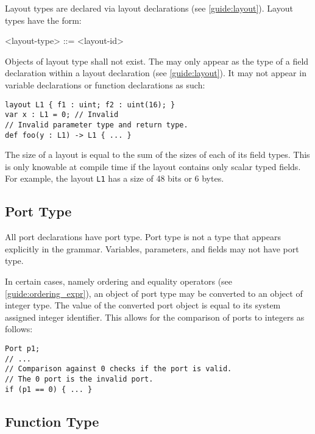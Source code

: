 Layout types are declared via layout declarations (see \ref{guide:layout}). Layout types have the form:

\begin{minip}
\begin{grammar}
<layout-type> ::= <layout-id>
\end{grammar}
\end{minip}

Objects of layout type shall not exist. The  may only appear as the type of a field declaration within a layout declaration (see \ref{guide:layout}). It may not appear in variable declarations or function declarations as such:

\begin{minip}
\begin{lstlisting}
layout L1 { f1 : uint; f2 : uint(16); }
var x : L1 = 0; // Invalid
// Invalid parameter type and return type.
def foo(y : L1) -> L1 { ... }
\end{lstlisting}
\end{minip}

The size of a layout is equal to the sum of the sizes of each of its field types. This is only knowable at compile time if the layout contains only scalar typed fields. For example, the layout \texttt{L1} has a size of 48 bits or 6 bytes.

\subsection{Port Type} \label{guide:port_type}

All port declarations have port type. Port type is not a type that appears explicitly in the grammar. Variables, parameters, and fields may not have port type.

In certain cases, namely ordering and equality operators (see \ref{guide:ordering_expr}), an object of port type may be converted to an object of integer type. The value of the converted port object is equal to its system assigned integer identifier. This allows for the comparison of ports to integers as follows:

\begin{minip}
\begin{lstlisting}
Port p1;
// ...
// Comparison against 0 checks if the port is valid.
// The 0 port is the invalid port.
if (p1 == 0) { ... }
\end{lstlisting}
\end{minip}

\subsection{Function Type} \label{guide:function_type}

